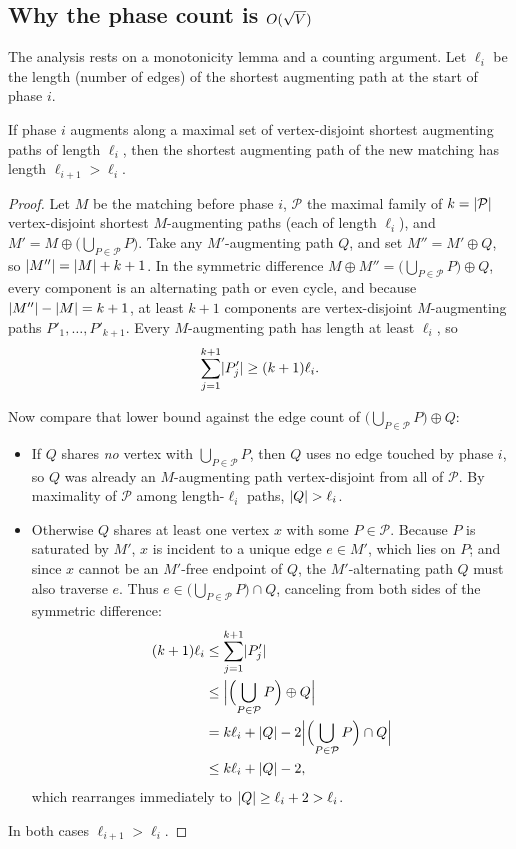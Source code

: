 \subsection{Why the phase count is \texorpdfstring{$O(\sqrt{V})$}{O(sqrt V)}}
\label{ch15:hk-analysis}

The analysis rests on a monotonicity lemma and a counting argument. Let
$\ell_i$ be the length (number of edges) of the shortest augmenting path at the
start of phase $i$.

\begin{lemma}
\label{ch15:lem-monotone}
If phase $i$ augments along a maximal set of vertex-disjoint shortest augmenting
paths of length $\ell_i$, then the shortest augmenting path of the new matching
has length $\ell_{i+1}>\ell_i$.
\end{lemma}

\begin{proof}
Let $M$ be the matching before phase $i$, $\mathcal{P}$ the maximal family of
$k=\lvert\mathcal{P}\rvert$ vertex-disjoint shortest $M$-augmenting paths (each of length
$\ell_i$), and $M' = M \oplus \bigl(\bigcup_{P\in\mathcal{P}} P\bigr)$. Take any
$M'$-augmenting path $Q$, and set $M'' = M' \oplus Q$, so $\lvert M''\rvert = \lvert M\rvert + k + 1$.
In the symmetric difference $M \oplus M'' = \bigl(\bigcup_{P\in\mathcal{P}} P\bigr) \oplus Q$,
every component is an alternating path or even cycle, and because $\lvert M''\rvert-\lvert M\rvert=k+1$,
at least $k+1$ components are vertex-disjoint $M$-augmenting paths $P'_1,\dots,P'_{k+1}$.
Every $M$-augmenting path has length at least $\ell_i$, so
\[
\sum_{j=1}^{k+1}\lvert P'_j\rvert \ge (k+1)\ell_i.
\]

Now compare that lower bound against the edge count of $\bigl(\bigcup_{P\in\mathcal{P}} P\bigr) \oplus Q$:
\begin{itemize}
\item If $Q$ shares \emph{no} vertex with $\bigcup_{P\in\mathcal{P}} P$, then $Q$ uses no edge touched
by phase $i$, so $Q$ was already an $M$-augmenting path vertex-disjoint from all of
$\mathcal{P}$. By maximality of $\mathcal{P}$ among length-$\ell_i$ paths, $\lvert Q\rvert > \ell_i$.
\item Otherwise $Q$ shares at least one vertex $x$ with some $P\in\mathcal{P}$. Because $P$ is
saturated by $M'$, $x$ is incident to a unique edge $e\in M'$, which lies on $P$; and since $x$
cannot be an $M'$-free endpoint of $Q$, the $M'$-alternating path $Q$ must also traverse $e$.
Thus $e \in \bigl(\bigcup_{P\in\mathcal{P}} P\bigr) \cap Q$, canceling from both sides of the
symmetric difference:
\begin{align*}
  (k+1)\ell_i &\le \sum_{j=1}^{k+1}\lvert P'_j\rvert \\
  &\le \Bigl\lvert\Bigl(\bigcup_{P\in\mathcal{P}} P\Bigr)\oplus Q\Bigr\rvert \\
  &= k\ell_i + \lvert Q\rvert - 2\Bigl\lvert\Bigl(\bigcup_{P\in\mathcal{P}} P\Bigr)\cap Q\Bigr\rvert \\
  &\le k\ell_i + \lvert Q\rvert - 2,
\end{align*}
which rearranges immediately to $\lvert Q\rvert \ge \ell_i + 2 > \ell_i$.
\end{itemize}
In both cases $\ell_{i+1} > \ell_i$.
\end{proof}

